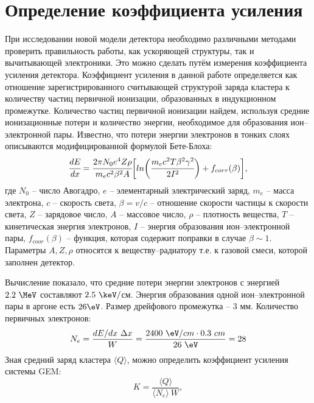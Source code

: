 \section{Определение коэффициента усиления}
\label{sec:ampl_с}
При исследовании новой модели детектора необходимо различными методами проверить правильность работы, как ускоряющей структуры, так и вычитывающей электроники. Это можно сделать путём измерения коэффициента усиления детектора. 
Коэффициент усиления в данной работе определяется как отношение зарегистрированного считывающей структурой заряда кластера к количеству частиц первичной ионизации, образованных в индукционном промежутке. 
Количество частиц первичной ионизации найдем, используя средние ионизационные потери и количество энергии, необходимое для образования ион--электронной пары. Известно, что потери энергии электронов в тонких слоях описываются модифицированной формулой Бете-Блоха:
\begin{equation}
\cfrac{dE}{dx} = \cfrac{2\pi N_0 e^4 Z\rho}{m_e c^2 \beta^2 A}\biggl[ln \bigg(\cfrac{ m_ec^2T\beta^2\gamma^2}{2I^2}\bigg) + f_{corr}(\beta)\biggr],
\label{eq:Bethe_Bloch}
\end{equation}
где $N_0$ -- число Авогадро, $e$ -- элементарный электрический заряд, $m_e$ -- масса электрона, $c$ -- скорость света, $\beta = v/c$ -- отношение скорости частицы к скорости света, $Z$ -- зарядовое число, $A$ -- массовое число, $\rho$ -- плотность вещества, $T$ -- кинетическая энергия электронов, $I$ -- энергия образования ион--электронной пары, $f_{coor}(\beta)$ -- функция, которая содержит поправки в случае $\beta \sim 1$. Параметры $A,Z,\rho$ относятся к веществу--радиатору т.е. к газовой смеси, которой заполнен детектор.
\par Вычисление показало, что средние потери энергии электронов с энергией $2.2~\MeV$ составляют $2.5~\keV/$см. Энергия образования одной ион--электронной пары в аргоне есть $26\eV$. Размер дрейфового промежутка -- 3 мм. Количество первичных электронов:
\begin{equation}
	N_e = \frac{dE/dx~\Delta x}{W} =\frac {2400~\eV/cm \cdot 0.3~cm}{26~\eV} = 28
\end{equation}
Зная средний заряд кластера $\langle Q\rangle$, можно определить коэффициент усиления системы GEM: 
\begin{equation}
K = \frac{\langle Q\rangle}{\langle N_e \rangle\ W},
\label{eq:ampl_k}
\end{equation}
